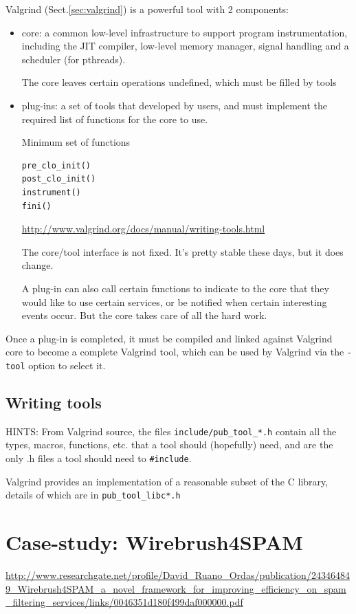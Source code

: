Valgrind (Sect.\ref{sec:valgrind}) is a powerful tool with 2 components:
\begin{itemize}
  \item  core: a common low-level infrastructure to support program
  instrumentation, including the JIT compiler, low-level memory manager, signal handling and a scheduler (for pthreads).
  
  The core leaves certain operations undefined, which must be filled by tools
  
  \item plug-ins: a set of tools that developed by users, and must implement
  the required list of functions for the core to use.
  
  Minimum set of functions
\begin{verbatim}
pre_clo_init()
post_clo_init()
instrument()
fini()
\end{verbatim}
\url{http://www.valgrind.org/docs/manual/writing-tools.html}
  
  The core/tool interface is not fixed. It's pretty stable these days, but it
  does change.
  
  A plug-in can also call certain functions to indicate to the core that they
  would like to use certain services, or be notified when certain interesting events
  occur. But the core takes care of all the hard work.
  
\end{itemize}

Once a plug-in is completed, it must be compiled and linked against Valgrind
core to become a complete Valgrind tool, which can be used by Valgrind via the
\verb!-tool! option to select it.

\subsection{Writing tools}


HINTS: 
From Valgrind source, the files \verb!include/pub_tool_*.h! contain all the
types, macros, functions, etc. that a tool should (hopefully) need, and are the
only .h files a tool should need to \verb!#include!.

Valgrind provides an implementation of a reasonable subset of the C library,
details of which are in \verb!pub_tool_libc*.h!



\section{Case-study: Wirebrush4SPAM}


\url{http://www.researchgate.net/profile/David_Ruano_Ordas/publication/243464849_Wirebrush4SPAM_a_novel_framework_for_improving_efficiency_on_spam_filtering_services/links/0046351d180f499daf000000.pdf}